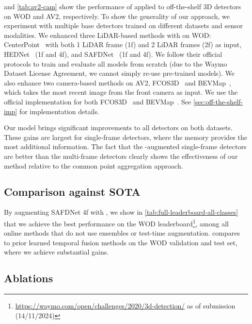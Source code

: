  and \cref{tab:av2-cam} show the performance of \ourmodel{} applied to off-the-shelf 3D detectors on WOD and AV2, respectively.%
To show the generality of our approach, we experiment with multiple base detectors trained on different datasets and sensor modalities.
We enhanced three LiDAR-based methods with \ourmodel{} on WOD:
CenterPoint~\cite{centerpoint}
with both 1 LiDAR frame (1f) and 2 LiDAR frames (2f) as input,
HEDNet~\cite{hednet} (1f and 4f),
and SAFDNet~\cite{safdnet} (1f and 4f).
We follow their official protocols to train and evaluate all models from scratch (due to the Waymo Dataset License Agreement,
we cannot simply re-use pre-trained models).
We also enhance two camera-based methods on AV2, FCOS3D~\cite{wang2021fcos3d}
and BEVMap~\cite{chang2024bevmap},
which takes the most recent image from the front camera as input.
We use the official implementation for both FCOS3D~\cite{wang2021fcos3d} and BEVMap~\cite{chang2024bevmap}. 
See \cref{sec:off-the-shelf-imp} for implementation details.

Our model brings significant improvements to all detectors on both datasets.
These gains are largest for single-frame detectors, where the memory provides the most additional information.
The fact that the \ourmodel{}-augmented single-frame detectors are better than the multi-frame detectors clearly shows the effectiveness of our method relative to the common point aggregation approach.

\subsection{Comparison against SOTA}
\label{sec:sota}
By augmenting SAFDNet 4f with \ourmodel{},
we show in \cref{tab:full-leaderboard-all-classes} that we achieve the best performance on the WOD leaderboard\footnote{\label{wod_leaderboard2}\href{https://waymo.com/open/challenges/2020/3d-detection/}{https://waymo.com/open/challenges/2020/3d-detection/} as of submission (14/11/2024)}, among all online methods that do not use ensembles or test-time augmentation.
 compares \ourmodel{}
to prior learned temporal fusion methods on
the WOD validation and test set, where we achieve substantial gains.





\subsection{Ablations}
\label{sec:ablations}

